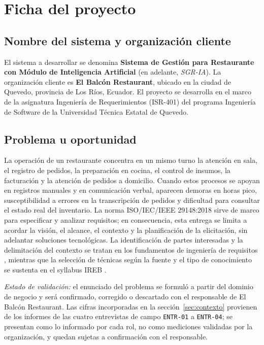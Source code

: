 \section{Ficha del proyecto}

\subsection{Nombre del sistema y organizaci\'on cliente}
El sistema a desarrollar se denomina \textbf{Sistema de Gesti\'on para Restaurante con M\'odulo de Inteligencia Artificial} (en adelante, \emph{SGR-IA}). La organizaci\'on cliente es \textbf{El Balcón Restaurant}, ubicado en la ciudad de Quevedo, provincia de Los R\'ios, Ecuador. El proyecto se desarrolla en el marco de la asignatura Ingenier\'ia de Requerimientos (ISR-401) del programa Ingenier\'ia de Software de la Universidad T\'ecnica Estatal de Quevedo.

\subsection{Problema u oportunidad}
La operaci\'on de un restaurante concentra en un mismo turno la atenci\'on en sala, el registro de pedidos, la preparaci\'on en cocina, el control de insumos, la facturaci\'on y la atenci\'on de pedidos a domicilio. Cuando estos procesos se apoyan en registros manuales y en comunicaci\'on verbal, aparecen demoras en horas pico, susceptibilidad a errores en la transcripci\'on de pedidos y dificultad para consultar el estado real del inventario. La norma ISO/IEC/IEEE 29148:2018 \cite{iso29148} sirve de marco para especificar y analizar requisitos; en consecuencia, esta entrega se limita a acordar la visi\'on, el alcance, el contexto y la planificaci\'on de la elicitaci\'on, sin adelantar soluciones tecnol\'ogicas. La identificaci\'on de partes interesadas y la delimitaci\'on del contexto se tratan en los fundamentos de ingenier\'ia de requisitos \cite{pohl2025}, mientras que la selecci\'on de t\'ecnicas seg\'un la fuente y el tipo de conocimiento se sustenta en el syllabus IREB \cite{ireb2026}.

\emph{Estado de validaci\'on:} el enunciado del problema se formul\'o a partir del dominio de negocio y ser\'a confirmado, corregido o descartado con el responsable de El Balcón Restaurant. Las cifras incorporadas en la secci\'on~\ref{sec:contexto} provienen de los informes de las cuatro entrevistas de campo \texttt{ENTR-01} a \texttt{ENTR-04}; se presentan como lo informado por cada rol, no como mediciones validadas por la organizaci\'on, y quedan sujetas a confirmaci\'on con el responsable.

